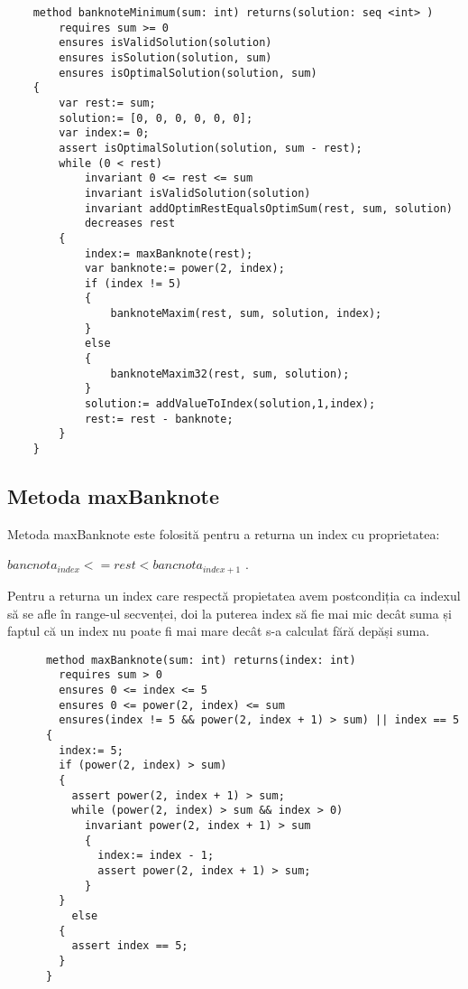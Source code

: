    \begin{lstlisting}
    method banknoteMinimum(sum: int) returns(solution: seq <int> )
        requires sum >= 0
        ensures isValidSolution(solution)
        ensures isSolution(solution, sum)
        ensures isOptimalSolution(solution, sum) 
    {
        var rest:= sum;
        solution:= [0, 0, 0, 0, 0, 0];
        var index:= 0;
        assert isOptimalSolution(solution, sum - rest);
        while (0 < rest)
            invariant 0 <= rest <= sum
            invariant isValidSolution(solution)
            invariant addOptimRestEqualsOptimSum(rest, sum, solution)
            decreases rest 
        {
            index:= maxBanknote(rest);
            var banknote:= power(2, index);
            if (index != 5) 
            {
                banknoteMaxim(rest, sum, solution, index);
            } 
            else 
            {
                banknoteMaxim32(rest, sum, solution);
            }
            solution:= addValueToIndex(solution,1,index);
            rest:= rest - banknote;
        }
    }
    \end{lstlisting}

    \subsection{Metoda maxBanknote}
    Metoda maxBanknote este folosită pentru a returna un index cu proprietatea: \par
     $bancnota_{index} <= rest < bancnota_{index + 1}$  .\par
     Pentru a returna un index care respectă propietatea avem postcondiția ca indexul să se afle în range-ul secvenței, 
     doi la puterea index să fie mai mic decât suma și faptul că un index nu poate fi mai mare decât s-a calculat fără 
     depăși suma.
    \begin{lstlisting}
      method maxBanknote(sum: int) returns(index: int)
        requires sum > 0
        ensures 0 <= index <= 5
        ensures 0 <= power(2, index) <= sum
        ensures(index != 5 && power(2, index + 1) > sum) || index == 5 
      {
        index:= 5;
        if (power(2, index) > sum) 
        {
          assert power(2, index + 1) > sum;
          while (power(2, index) > sum && index > 0)
            invariant power(2, index + 1) > sum 
            {
              index:= index - 1;
              assert power(2, index + 1) > sum;
            }
        } 
          else 
        {
          assert index == 5;
        }
      }
    \end{lstlisting}


